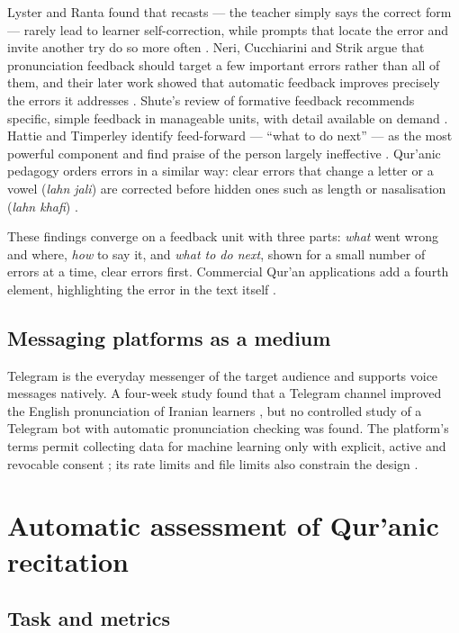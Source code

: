 Lyster and Ranta found that recasts --- the teacher simply says the correct form --- rarely lead to
learner self-correction, while prompts that locate the error and invite another try do so more often
\cite{SRC-053}. Neri, Cucchiarini and Strik argue that pronunciation feedback should target a few
important errors rather than all of them, and their later work showed that automatic feedback improves
precisely the errors it addresses \cite{SRC-054}. Shute's review of formative feedback recommends
specific, simple feedback in manageable units, with detail available on demand \cite{SRC-055}. Hattie and
Timperley identify feed-forward --- ``what to do next'' --- as the most powerful component and find praise
of the person largely ineffective \cite{SRC-056}. Qur'anic pedagogy orders errors in a similar way:
clear errors that change a letter or a vowel (\emph{lahn jali}) are corrected before hidden ones such as
length or nasalisation (\emph{lahn khafi}) \cite{SRC-052}.

These findings converge on a feedback unit with three parts: \emph{what} went wrong and where, \emph{how}
to say it, and \emph{what to do next}, shown for a small number of errors at a time, clear errors first.
Commercial Qur'an applications add a fourth element, highlighting the error in the text itself
\cite{SRC-046}.

\subsection{Messaging platforms as a medium}

Telegram is the everyday messenger of the target audience and supports voice messages natively. A
four-week study found that a Telegram channel improved the English pronunciation of Iranian learners
\cite{SRC-092}, but no controlled study of a Telegram bot with automatic pronunciation checking was found.
The platform's terms permit collecting data for machine learning only with explicit, active and revocable
consent \cite{SRC-033}; its rate limits and file limits also constrain the design \cite{SRC-060}.

\section{Automatic assessment of Qur'anic recitation}\label{sec:lr-mdd}

\subsection{Task and metrics}

